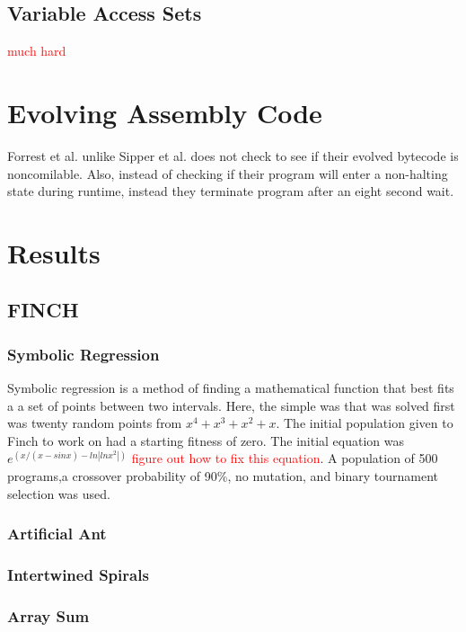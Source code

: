 \documentclass{sig-alternate}
\newcommand{\mycomment}[1]{\textcolor{red}{#1}}
\begin{document}
\subsection{Variable Access Sets}
\cite{FINCH2:2009} \mycomment{much hard}


\section{Evolving Assembly Code}
	Forrest et al.\cite{Assembly:2010} unlike Sipper et al.\cite{FINCH:2011} does not check to see if their evolved bytecode is noncomilable. Also, instead of checking if their program will enter a non-halting state during runtime, instead they terminate program after an eight second wait.



\section{Results}
\subsection{FINCH}
\subsubsection{Symbolic Regression}
	Symbolic regression is a method of finding a mathematical function that best fits a a set of points between two intervals. Here, the simple was that was solved first was twenty random points from \begin{math}x^4+x^3+x^2+x\end{math}. The initial population given to Finch to work on had a starting fitness of zero. The initial equation was \begin{math} e^(x/(x-sinx) - ln|lnx^2|)\end{math} \mycomment{figure out how to fix this equation}. A population of 500 programs,a crossover probability of 90\%, no mutation, and binary tournament selection was used.
\subsubsection{Artificial Ant}
\subsubsection{Intertwined Spirals}
\subsubsection{Array Sum}
\end{document}
